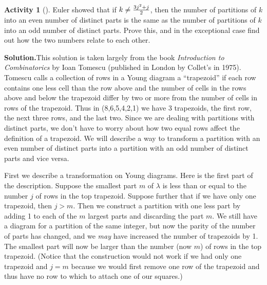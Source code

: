 \documentclass[10pt,]{book}
\theoremstyle{plain}
\theoremstyle{definition}
\newtheorem{activity}[project]{Activity}
\numberwithin{equation}{chapter}
\begin{document}
\begin{activity}[]\label{activity-97}
Euler showed that if \(k\not= {3j^2+j\over 2}\), then the number of partitions of \(k\) into an even number of distinct parts is the same as the number of partitions of \(k\) into an odd number of distinct parts. Prove this, and in the exceptional case find out how the two numbers relate to each other.%
\par\medskip\noindent%
\textbf{Solution.}\quad This solution is taken largely from the book \textsl{Introduction to Combinatorics} by Ioan Tomescu (published in London by Collet's in 1975). Tomescu calls a collection of rows in a Young diagram a ``trapezoid'' if each row contains one less cell than the row above and the number of cells in the rows above and below the trapezoid differ by two or more from the number of cells in rows of the trapezoid. Thus in (8,6,5,4,2,1) we have 3 trapezoids, the first row, the next three rows, and the last two. Since we are dealing with partitions with distinct parts, we don't have to worry about how two equal rows affect the definition of a trapezoid. We will describe a way to transform a partition with an even number of distinct parts into a partition with an odd number of distinct parts and vice versa.%
\par
First we describe a transformation on Young diagrams. Here is the first part of the description. Suppose the smallest part \(m\) of \(\lambda\) is less than or equal to the number \(j\) of rows in the top trapezoid. Suppose further that if we have only one trapezoid, then \(j>m\). Then we construct a partition with one less part by adding 1 to each of the \(m\) largest parts and discarding the part \(m\). We still have a diagram for a partition of the same integer, but now the parity of the number of parts has changed, and we \emph{may} have increased the number of trapezoids by 1. The smallest part will now be larger than the number (now \(m\)) of rows in the top trapezoid. (Notice that the construction would not work if we had only one trapezoid and \(j=m\) because we would first remove one row of the trapezoid and thus have no row to which to attach one of our squares.)%
\par

\end{activity}
\end{document}
